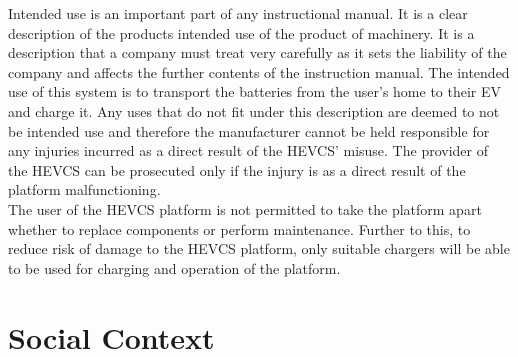 \documentclass [12pt]{article}
\begin{document}
Intended use is an important part of any instructional manual. It is a clear description of the products intended use of the product of machinery. It is a description that a company must treat very carefully as it sets the liability of the company and affects the further contents of the instruction manual. \cite{Intended_Use}
The intended use of this system is to transport the batteries from the user’s home to their EV and charge it. Any uses that do not fit under this description are deemed to not be intended use and therefore the manufacturer cannot be held responsible for any injuries incurred as a direct result of the HEVCS’ misuse. The provider of the HEVCS can be prosecuted only if the injury is as a direct result of the platform malfunctioning.
\\
The user of the HEVCS platform is not permitted to take the platform apart whether to replace components or perform maintenance. Further to this, to reduce risk of damage to the HEVCS platform, only suitable chargers will be able to be used for charging and operation of the platform.

\section{Social Context}\label{sec:Social_Context}
\end{document}
